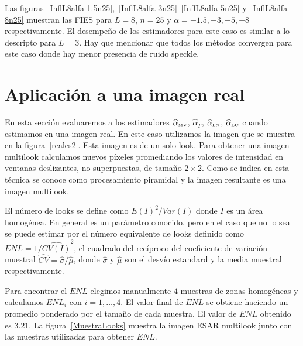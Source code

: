 Las figuras~\ref{InflL8alfa-1.5n25},~\ref{InflL8alfa-3n25}~\ref{InflL8alfa-5n25} y~\ref{InflL8alfa-8n25} muestran las FIES para $L=8$, $n=25$ y $\alpha=-1.5, -3, -5, -8$ respectivamente. El desempeño de los estimadores para este caso es similar a lo descripto para $L=3$. Hay que mencionar que todos los métodos convergen para este caso donde hay menor presencia de ruido speckle. 


\section{Aplicación a una imagen real}
\label{AplicacionImagenReal}

En esta sección evaluaremos a los estimadores $\widehat{\alpha}_{\text{\tiny{MV}}}$, $\widehat{\alpha}_{\Gamma}$, $\widehat{\alpha}_{\text{\tiny{LN}}}$, $\widehat{\alpha}_{\text{\tiny{LC}}}$ cuando estimamos en una imagen real. En este caso utilizamos la imagen que se muestra en la figura~\ref{reales2}. Esta imagen es de un solo look. Para obtener una imagen multilook calculamos nuevos píxeles promediando los valores de intensidad en ventanas deslizantes, no superpuestas, de tamaño $2\times2$. Como se indica en \citet{Adelson1984} esta técnica se conoce como procesamiento piramidal y la imagen resultante es una imagen multilook. 

El número de looks se define como $E(I)^2/Var(I)$ donde $I$ es un área homogénea. En general es un parámetro conocido, pero en el caso que no lo sea se puede estimar por el número equivalente de looks definido como $ENL=1/\widehat{CV(I)}^2$, el cuadrado del recíproco del coeficiente de variación muestral $\widehat{CV}=\widehat{\sigma}/\widehat{\mu}$, donde $\widehat{\sigma}$ y $\widehat{\mu}$ son el desvío estandard y la media muestral respectivamente.

Para encontrar el $ENL$ elegimos manualmente $4$ muestras de zonas homogéneas y calculamos $ENL_i$ con $i=1,\ldots,4$. El valor final de $ENL$ se obtiene haciendo un promedio ponderado por el tamaño de cada muestra. El valor de $ENL$ obtenido es $3.21$. La figura~\ref{MuestraLooks} muestra la imagen ESAR multilook junto con las muestras utilizadas para obtener $ENL$.

